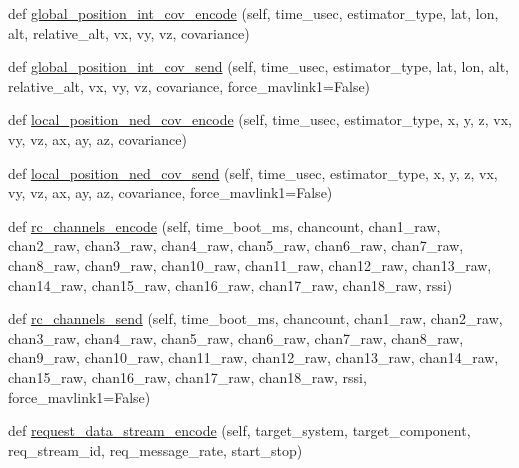\begin{DoxyCompactItemize}
\item 
def \hyperlink{classpymavlink_1_1dialects_1_1v10_1_1MAVLink_a2dd5607cfdd5edd95c77b831834be2c7}{global\+\_\+position\+\_\+int\+\_\+cov\+\_\+encode} (self, time\+\_\+usec, estimator\+\_\+type, lat, lon, alt, relative\+\_\+alt, vx, vy, vz, covariance)
\item 
def \hyperlink{classpymavlink_1_1dialects_1_1v10_1_1MAVLink_acb99b22c9f74ee9f2edd07d09ad39355}{global\+\_\+position\+\_\+int\+\_\+cov\+\_\+send} (self, time\+\_\+usec, estimator\+\_\+type, lat, lon, alt, relative\+\_\+alt, vx, vy, vz, covariance, force\+\_\+mavlink1=False)
\item 
def \hyperlink{classpymavlink_1_1dialects_1_1v10_1_1MAVLink_a35978715abfebd4de0108ce6464485fb}{local\+\_\+position\+\_\+ned\+\_\+cov\+\_\+encode} (self, time\+\_\+usec, estimator\+\_\+type, x, y, z, vx, vy, vz, ax, ay, az, covariance)
\item 
def \hyperlink{classpymavlink_1_1dialects_1_1v10_1_1MAVLink_ac5886ff0ee904217db62e0554f14f9fc}{local\+\_\+position\+\_\+ned\+\_\+cov\+\_\+send} (self, time\+\_\+usec, estimator\+\_\+type, x, y, z, vx, vy, vz, ax, ay, az, covariance, force\+\_\+mavlink1=False)
\item 
def \hyperlink{classpymavlink_1_1dialects_1_1v10_1_1MAVLink_a5ad3cc42fd8323b455ea8ac844057eb1}{rc\+\_\+channels\+\_\+encode} (self, time\+\_\+boot\+\_\+ms, chancount, chan1\+\_\+raw, chan2\+\_\+raw, chan3\+\_\+raw, chan4\+\_\+raw, chan5\+\_\+raw, chan6\+\_\+raw, chan7\+\_\+raw, chan8\+\_\+raw, chan9\+\_\+raw, chan10\+\_\+raw, chan11\+\_\+raw, chan12\+\_\+raw, chan13\+\_\+raw, chan14\+\_\+raw, chan15\+\_\+raw, chan16\+\_\+raw, chan17\+\_\+raw, chan18\+\_\+raw, rssi)
\item 
def \hyperlink{classpymavlink_1_1dialects_1_1v10_1_1MAVLink_a3533e622bea4f92702fe425b99ee6abb}{rc\+\_\+channels\+\_\+send} (self, time\+\_\+boot\+\_\+ms, chancount, chan1\+\_\+raw, chan2\+\_\+raw, chan3\+\_\+raw, chan4\+\_\+raw, chan5\+\_\+raw, chan6\+\_\+raw, chan7\+\_\+raw, chan8\+\_\+raw, chan9\+\_\+raw, chan10\+\_\+raw, chan11\+\_\+raw, chan12\+\_\+raw, chan13\+\_\+raw, chan14\+\_\+raw, chan15\+\_\+raw, chan16\+\_\+raw, chan17\+\_\+raw, chan18\+\_\+raw, rssi, force\+\_\+mavlink1=False)
\item 
def \hyperlink{classpymavlink_1_1dialects_1_1v10_1_1MAVLink_ae11ecd360e13dd2adefcc5d62844b6ab}{request\+\_\+data\+\_\+stream\+\_\+encode} (self, target\+\_\+system, target\+\_\+component, req\+\_\+stream\+\_\+id, req\+\_\+message\+\_\+rate, start\+\_\+stop)
\item 

\end{DoxyCompactItemize}
